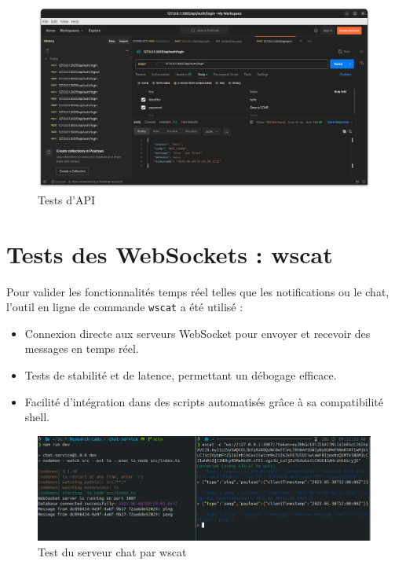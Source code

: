 \documentclass{rapportPfe}
\begin{document}
\FloatBarrier
\begin{figure}[htbp]
    \centering
    \includegraphics[width=1.0\textwidth]{diagrams/ss_05.png}
    \caption{Tests d'API}
    \label{fig:diagram5}
\end{figure}

\section{Tests des WebSockets : wscat}

Pour valider les fonctionnalités temps réel telles que les notifications ou le chat, l’outil en ligne de commande \texttt{wscat} a été utilisé :

\begin{itemize}
    \item Connexion directe aux serveurs WebSocket pour envoyer et recevoir des messages en temps réel.
    \item Tests de stabilité et de latence, permettant un débogage efficace.
    \item Facilité d’intégration dans des scripts automatisés grâce à sa compatibilité shell.
\end{itemize}

\FloatBarrier
\begin{figure}[htbp]
    \centering
    \includegraphics[width=1.0\textwidth]{diagrams/ss_08.png}
    \caption{Test du serveur chat par wscat}
    \label{fig:diagram5}
\end{figure}
\end{document}
